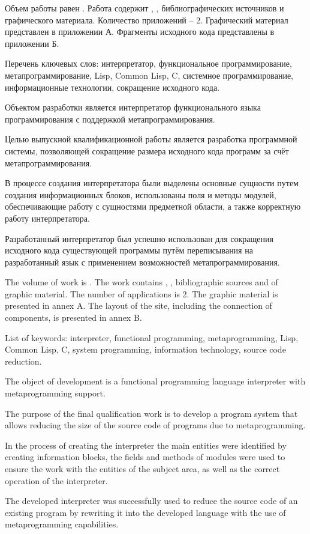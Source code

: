 
Объем работы равен . Работа содержит , ,  библиографических источников и  графического материала. Количество приложений – 2. Графический материал представлен в приложении А. Фрагменты исходного кода представлены в приложении Б.

Перечень ключевых слов: интерпретатор, функциональное программирование, метапрограммирование, Lisp, Common Lisp, C, системное программирование, информационные технологии, сокращение исходного кода.

Объектом разработки является интерпретатор функционального языка программирования с поддержкой метапрограммирования.

Целью выпускной квалификационной работы является разработка программной системы, позволяющей сокращение размера исходного кода программ за счёт метапрограммирования.

В процессе создания интерпретатора были выделены основные сущности путем создания информационных блоков, использованы поля и методы модулей, обеспечивающие работу с сущностями предметной области, а также корректную работу интерпретатора.

Разработанный интерпретатор был успешно использован для сокращения исходного кода существующей программы путём переписывания на разработанный язык с применением возможностей метапрограммирования.

  
The volume of work is . The work contains , ,  bibliographic sources and  of graphic material. The number of applications is 2. The graphic material is presented in annex A. The layout of the site, including the connection of components, is presented in annex B.

List of keywords: interpreter, functional programming, metaprogramming, Lisp, Common Lisp, C, system programming, information technology, source code reduction.


The object of development is a functional programming language interpreter with metaprogramming support.

The purpose of the final qualification work is to develop a program system that allows reducing the size of the source code of programs due to metaprogramming.

In the process of creating the interpreter the main entities were identified by creating information blocks, the fields and methods of modules were used to ensure the work with the entities of the subject area, as well as the correct operation of the interpreter.

The developed interpreter was successfully used to reduce the source code of an existing program by rewriting it into the developed language with the use of metaprogramming capabilities.
